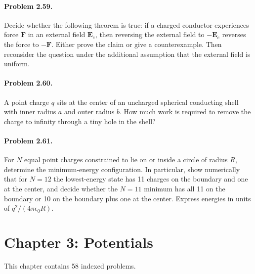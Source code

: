 \documentclass{aa}
\newcommand{\problemstatement}[2]{%
\paragraph{Problem #1.}#2\par\medskip
}
\begin{document}
\problemstatement{2.59}{Decide whether the following theorem is true: if a charged conductor experiences force \(\mathbf F\) in an external field \(\mathbf E_e\), then reversing the external field to \(-\mathbf E_e\) reverses the force to \(-\mathbf F\). Either prove the claim or give a counterexample. Then reconsider the question under the additional assumption that the external field is uniform.}
\problemstatement{2.60}{A point charge \(q\) sits at the center of an uncharged spherical conducting shell with inner radius \(a\) and outer radius \(b\). How much work is required to remove the charge to infinity through a tiny hole in the shell?}
\problemstatement{2.61}{For \(N\) equal point charges constrained to lie on or inside a circle of radius \(R\), determine the minimum-energy configuration. In particular, show numerically that for \(N=12\) the lowest-energy state has 11 charges on the boundary and one at the center, and decide whether the \(N=11\) minimum has all 11 on the boundary or 10 on the boundary plus one at the center. Express energies in units of \(q^2/(4\pi\epsilon_0 R)\).}

\section{Chapter 3: Potentials}
This chapter contains 58 indexed problems.
\end{document}
